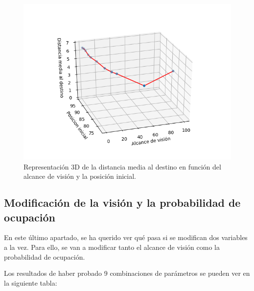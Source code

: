 \documentclass[11pt,a4paper]{report}
\begin{document}
\begin{figure}[H]
\centering
\includegraphics[scale=0.49]{img/aparc-vis-3d.png}
\caption{Representación 3D de la distancia media al destino en función del alcance de visión y
la posición inicial.}
\label{aparc-3d-vis}
\end{figure}

\subsection{Modificación de la visión y la probabilidad de ocupación}

En este último apartado, se ha querido ver qué pasa si se modifican dos variables a la vez. Para ello, se van a
modificar tanto el alcance de visión como la probabilidad de ocupación.

Los resultados de haber probado 9 combinaciones de parámetros se pueden ver en la siguiente tabla:
\end{document}
